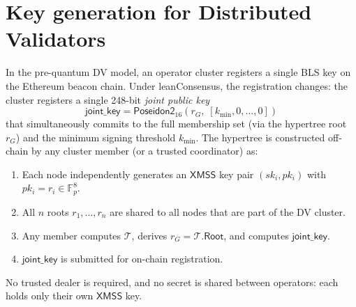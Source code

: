 \documentclass[11pt,a4paper]{article}
\newcommand{\KB}{\mathbb{F}_{p}}  %
\newcommand{\XMSS}{\textsf{XMSS}\xspace}
\newcommand{\hypertree}{\mathcal{T}}
\newcommand{\poseidon}{\textsf{Poseidon2}\xspace}
\newcommand{\leanConsensus}{\textsf{leanConsensus}\xspace}
\begin{document}

\section{Key generation for Distributed Validators}

In the pre-quantum DV model, an operator cluster registers a single BLS key on the Ethereum beacon chain.  Under \leanConsensus, the registration changes: the cluster registers a single 248-bit \emph{joint public key}
\[
  \mathsf{joint\_key} = \poseidon_{16}(r_G,\; [k_{\min}, 0, \ldots, 0])
\]
that simultaneously commits to the full membership set (via the hypertree root $r_G$) and the minimum signing threshold $k_{\min}$.
The hypertree is constructed off-chain by any cluster member (or a trusted coordinator) as:
\begin{enumerate}
  \item Each node independently generates an $\XMSS$ key pair  $(sk_i, pk_i)$ with $pk_i = r_i \in \KB^8$.
  \item All $n$ roots $r_1, \ldots, r_n$ are shared to all nodes that are part of the DV cluster.
  \item Any member computes $\hypertree$, derives $r_G = \hypertree.\mathsf{Root}$, and computes $\mathsf{joint\_key}$.
  \item $\mathsf{joint\_key}$ is submitted for on-chain registration.
\end{enumerate}

No trusted dealer is required, and no secret is shared between operators: each holds only their own $\XMSS$ key.
\end{document}
